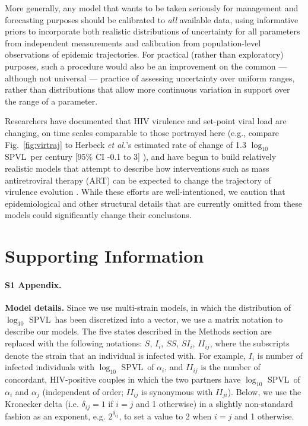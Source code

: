 \documentclass[10pt,letterpaper]{article}
\newcommand{\Lspvl}{$\log_{10}$ SPVL}
\newcommand{\etal}{\textit{et al.}}
\begin{document}
More generally, any model that wants to be
taken seriously for management and forecasting purposes should
be calibrated to \emph{all} available data, using informative
priors to incorporate both realistic distributions of uncertainty
for all parameters from independent measurements \cite{elderd_uncertainty_2006}
and calibration from population-level observations of epidemic
trajectories. For practical (rather than exploratory) purposes,
such a procedure would also be an improvement on the common --- although not universal --- %
practice of assessing uncertainty over uniform ranges, rather than
distributions that allow more continuous variation in support over
the range of a parameter.

Researchers have documented that HIV virulence and set-point viral
load are changing, on time scales comparable to those portrayed here
(e.g., compare Fig.~\ref{fig:virtraj} to Herbeck \etal's
estimated rate of change of 1.3 \Lspvl\ per century [95\% CI -0.1 to
  3] \cite{herbeck_is_2012}), and have begun to build relatively realistic models that
attempt to describe how interventions such as mass antiretroviral
therapy (ART) can be expected to change the trajectory of virulence
evolution \cite{payne_impact_2014,herbeck2016evolution}.  While these
efforts are well-intentioned, we caution that epidemiological and
other structural details that are currently omitted from these models
could significantly change their conclusions.

\section*{Supporting Information}

\paragraph*{S1 Appendix.}
\label{S1_Appendix}
{\bf Model details.} Since we use multi-strain models, in which the distribution of \Lspvl\ has been discretized into a vector, we use a matrix notation to describe our models. The five states described in the Methods section are replaced with the following notations: $S$, $I_i$, $SS$, $SI_i$, $II_{ij}$, where the subscripts denote the strain that an individual is infected with. For example, $I_i$ is number of infected individuals with \Lspvl\ of $\alpha_i$, and $II_{ij}$ is the number of concordant, HIV-positive couples in which the two partners have \Lspvl\ of $\alpha_i$ and $\alpha_j$ (independent of order; $II_{ij}$ is synonymous with $II_{ji}$). 
Below, we use the Kronecker delta (i.e. $\delta_{ij}=1$ if $i=j$ and 1 otherwise) in a slightly non-standard fashion as an exponent, e.g. $2^{\delta_{ij}}$, to set a value to 2 when $i=j$ and 1 otherwise.
\end{document}
